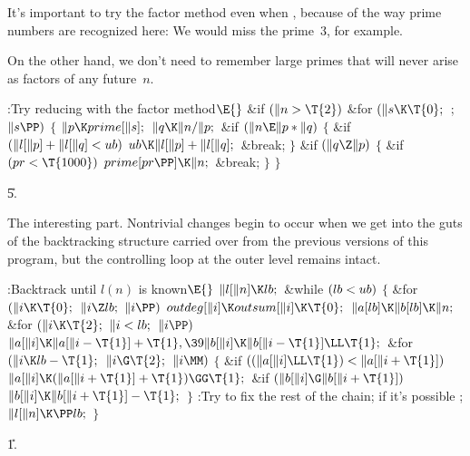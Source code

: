 It's important to try the factor method even when ,
because
of the way prime numbers are recognized here: We would miss the
prime~3, for example.

On the other hand, we don't need to remember large primes that will
never arise as factors of any future~$n$.

\Y\B\4:Try reducing  with the factor method\X${}\E{}$\6
\&{if} ${}(\|n>\T{2}){}$\1\6
\&{for} ${}(\|s\K\T{0};{}$  ; ${}\|s\PP){}$\5
${}\{{}$\1\6
${}\|p\K\\{prime}[\|s];{}$\6
${}\|q\K\|n/\|p;{}$\6
\&{if} ${}(\|n\E\|p*\|q){}$\5
${}\{{}$\1\6
\&{if} ${}(\|l[\|p]+\|l[\|q]<\\{ub}){}$\1\5
${}\\{ub}\K\|l[\|p]+\|l[\|q];{}$\2\6
\&{break};\6
\4${}\}{}$\2\6
\&{if} ${}(\|q\Z\|p){}$\5
${}\{{}$\1\6
\&{if} ${}(\\{pr}<\T{1000}){}$\1\5
${}\\{prime}[\\{pr}\PP]\K\|n;{}$\2\6
\&{break};\6
\4${}\}{}$\2\6
\4${}\}{}$\2\2\par
\U5.\fi

The interesting part.
Nontrivial changes begin to occur when we get into the guts of
the backtracking structure carried over from the previous versions of this
program, but the controlling loop at the outer level remains intact.

\Y\B\4:Backtrack until $l(n)$ is known\X${}\E{}$\6
$\|l[\|n]\K\\{lb};{}$\6
\&{while} ${}(\\{lb}<\\{ub}){}$\5
${}\{{}$\1\6
\&{for} ${}(\|i\K\T{0};{}$ ${}\|i\Z\\{lb};{}$ ${}\|i\PP){}$\1\5
${}\\{outdeg}[\|i]\K\\{outsum}[\|i]\K\T{0};{}$\2\6
${}\|a[\\{lb}]\K\|b[\\{lb}]\K\|n;{}$\6
\&{for} ${}(\|i\K\T{2};{}$ ${}\|i<\\{lb};{}$ ${}\|i\PP){}$\1\5
${}\|a[\|i]\K\|a[\|i-\T{1}]+\T{1},\39\|b[\|i]\K\|b[\|i-\T{1}]\LL\T{1};{}$\2\6
\&{for} ${}(\|i\K\\{lb}-\T{1};{}$ ${}\|i\G\T{2};{}$ ${}\|i\MM){}$\5
${}\{{}$\1\6
\&{if} ${}((\|a[\|i]\LL\T{1})<\|a[\|i+\T{1}]){}$\1\5
${}\|a[\|i]\K(\|a[\|i+\T{1}]+\T{1})\GG\T{1};{}$\2\6
\&{if} ${}(\|b[\|i]\G\|b[\|i+\T{1}]){}$\1\5
${}\|b[\|i]\K\|b[\|i+\T{1}]-\T{1};{}$\2\6
\4${}\}{}$\2\6
:Try to fix the rest of the chain;  if it's possible%
\X;\6
${}\|l[\|n]\K\PP\\{lb};{}$\6
\4${}\}{}$\2\par
\U1.\fi

